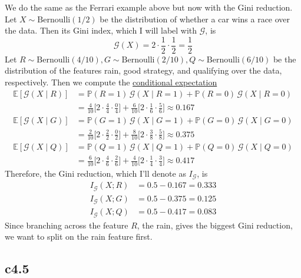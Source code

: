   \begin{example}
    \label{ex:ferrari-example-continued}
    We do the same as the Ferrari example above but now with the Gini reduction. Let $X \sim \mathrm{Bernoulli}(1/2)$ be the distribution of whether a car wins a race over the data. Then its Gini index, which I will label with $\mathcal{G}$, is 
    \begin{equation}
      \mathcal{G} (X) = 2 \cdot \frac{1}{2} \cdot \frac{1}{2} = \frac{1}{2}
    \end{equation}
    Let $R \sim \mathrm{Bernoulli}(4/10), G \sim \mathrm{Bernoulli}(2/10), Q \sim \mathrm{Bernoulli}(6/10)$ be the distribution of the features rain, good strategy, and qualifying over the data, respectively. Then we compute the \hyperref[prob-def:cond-exp]{conditional expectation} 
    \begin{align*}
        \mathbb{E}[\mathcal{G}(X \mid R)] & = \mathbb{P}(R = 1)\, \mathcal{G}(X \mid R = 1) + \mathbb{P}(R = 0) \, \mathcal{G}(X \mid R = 0) \\ 
        & = \frac{4}{10} \bigg[ 2 \cdot \frac{4}{4} \cdot \frac{0}{4} \bigg] + \frac{6}{10} \bigg[ 2 \cdot \frac{1}{6} \cdot \frac{5}{6} \bigg] \approx 0.167 \\
        \mathbb{E}[\mathcal{G}(X \mid G)] & = \mathbb{P}(G = 1)\, \mathcal{G}(X \mid G = 1) + \mathbb{P}(G = 0) \, \mathcal{G}(X \mid G = 0) \\ 
        & = \frac{2}{10} \bigg[ 2 \cdot \frac{2}{2} \cdot \frac{0}{2} \bigg] + \frac{8}{10} \bigg[ 2 \cdot \frac{3}{8} \cdot \frac{5}{8} \bigg] \approx 0.375 \\
        \mathbb{E}[\mathcal{G}(X \mid Q)] & = \mathbb{P}(Q = 1)\, \mathcal{G}(X \mid Q = 1) + \mathbb{P}(Q = 0) \, \mathcal{G}(X \mid Q = 0) \\ 
        & = \frac{6}{10} \bigg[ 2 \cdot \frac{4}{6} \cdot \frac{2}{6} \bigg] + \frac{4}{10} \bigg[ 2 \cdot \frac{1}{4} \cdot \frac{3}{4} \bigg] \approx 0.417
    \end{align*}
    Therefore, the Gini reduction, which I'll denote as $I_{\mathcal{G}}$, is 
    \begin{align*}
        I_{\mathcal{G}} (X ; R) & = 0.5 - 0.167 = 0.333 \\
        I_{\mathcal{G}} (X ; G) & = 0.5 - 0.375 = 0.125 \\
        I_{\mathcal{G}} (X ; Q) & = 0.5 - 0.417 = 0.083
    \end{align*}
    Since branching across the feature $R$, the rain, gives the biggest Gini reduction, we want to split on the rain feature first. 
  \end{example}

\subsection{c4.5} 
